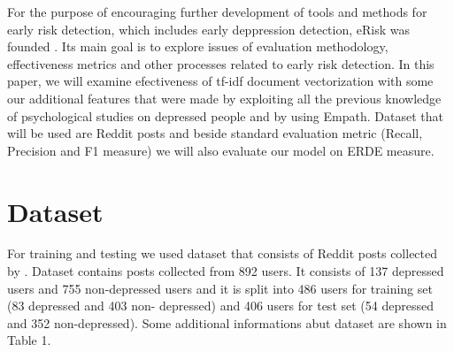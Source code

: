 \documentclass[10pt, a4paper]{article}
\begin{document}
For the purpose of encouraging further development of tools and methods for early risk detection, which includes early deppression detection, eRisk was founded \citep{LosadaCLEF2017}. Its main goal is to explore issues of evaluation methodology, effectiveness metrics and other processes related to early risk detection.
In this paper, we will examine efectiveness of tf-idf document vectorization with some our additional features that were made by exploiting all the previous knowledge of psychological studies on depressed people and by using Empath. Dataset that will be used are Reddit posts and beside standard evaluation metric (Recall, Precision and F1 measure) we will also evaluate our model on ERDE measure.

\section{Dataset}
For training and testing we used dataset that consists of Reddit posts collected by \citep{losada-crestani2016}. Dataset contains posts collected from 892 users.  It consists of 137 depressed users and 755 non-depressed users and it is split into 486 users for training set (83 depressed and 403 non- depressed) and 406 users for test set (54 depressed and 352 non-depressed). Some additional informations abut dataset are shown in Table 1.
\end{document}
